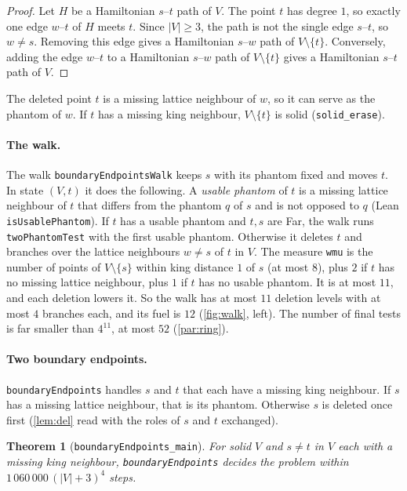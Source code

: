 \documentclass[11pt]{article}
\theoremstyle{plain}
\newtheorem{theorem}{Theorem}[section]
\theoremstyle{definition}
\theoremstyle{remark}
\newcommand{\lean}[1]{\texttt{#1}}
\begin{document}
\begin{proof}
Let $H$ be a Hamiltonian $s$--$t$ path of $V$.
The point $t$ has degree $1$, so exactly one edge $w$--$t$ of $H$ meets $t$.
Since $|V|\ge3$, the path is not the single edge $s$--$t$, so $w\ne s$.
Removing this edge gives a Hamiltonian $s$--$w$ path of $V\setminus\{t\}$.
Conversely, adding the edge $w$--$t$ to a Hamiltonian $s$--$w$ path of $V\setminus\{t\}$ gives a
Hamiltonian $s$--$t$ path of $V$.
\end{proof}

The deleted point $t$ is a missing lattice neighbour of $w$, so it can serve as the phantom of $w$.
If $t$ has a missing king neighbour, $V\setminus\{t\}$ is solid (\lean{solid\_erase}).

\paragraph{The walk.}
The walk \lean{boundaryEndpointsWalk} keeps $s$ with its phantom fixed and moves $t$.
In state $(V,t)$ it does the following.
A \emph{usable phantom} of $t$ is a missing lattice neighbour of $t$ that differs from the phantom
$q$ of $s$ and is not opposed to $q$ (Lean \lean{isUsablePhantom}).
If $t$ has a usable phantom and $t,s$ are Far, the walk runs \lean{twoPhantomTest} with the first usable phantom.
Otherwise it deletes $t$ and branches over the lattice neighbours $w\ne s$ of $t$ in $V$.
The measure \lean{wmu} is the number of points of $V\setminus\{s\}$ within king distance $1$ of $s$
(at most $8$), plus $2$ if $t$ has no missing lattice neighbour, plus $1$ if $t$ has no usable
phantom.
It is at most $11$, and each deletion lowers it.
So the walk has at most $11$ deletion levels with at most $4$ branches each, and its fuel is $12$
(\cref{fig:walk}, left).
The number of final tests is far smaller than $4^{11}$, at most $52$ (\cref{par:ring}).

\paragraph{Two boundary endpoints.}
\lean{boundaryEndpoints} handles $s$ and $t$ that each have a missing king neighbour.
If $s$ has a missing lattice neighbour, that is its phantom.
Otherwise $s$ is deleted once first (\cref{lem:del} read with the roles of $s$ and $t$ exchanged).
\begin{theorem}[\lean{boundaryEndpoints\_main}]
\label{thm:bdry}
For solid $V$ and $s\ne t$ in $V$ each with a missing king neighbour, \lean{boundaryEndpoints} decides the
problem within $1\,060\,000\,(|V|+3)^4$ steps.
\end{theorem}
\end{document}
